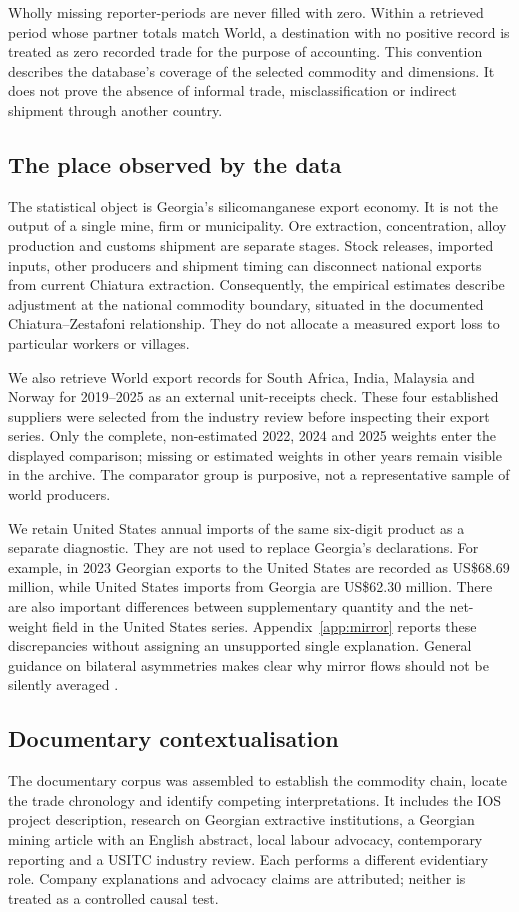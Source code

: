 \documentclass[11pt,a4paper]{article}
\begin{document}
Wholly missing reporter-periods are never filled with zero. Within a retrieved period whose partner totals match World, a destination with no positive record is treated as zero recorded trade for the purpose of accounting. This convention describes the database's coverage of the selected commodity and dimensions. It does not prove the absence of informal trade, misclassification or indirect shipment through another country.

\subsection{The place observed by the data}
The statistical object is Georgia's silicomanganese export economy. It is not the output of a single mine, firm or municipality. Ore extraction, concentration, alloy production and customs shipment are separate stages. Stock releases, imported inputs, other producers and shipment timing can disconnect national exports from current Chiatura extraction. Consequently, the empirical estimates describe adjustment at the national commodity boundary, situated in the documented Chiatura--Zestafoni relationship. They do not allocate a measured export loss to particular workers or villages.

We also retrieve World export records for South Africa, India, Malaysia and Norway for 2019--2025 as an external unit-receipts check. These four established suppliers were selected from the industry review before inspecting their export series. Only the complete, non-estimated 2022, 2024 and 2025 weights enter the displayed comparison; missing or estimated weights in other years remain visible in the archive. The comparator group is purposive, not a representative sample of world producers.

We retain United States annual imports of the same six-digit product as a separate diagnostic. They are not used to replace Georgia's declarations. For example, in 2023 Georgian exports to the United States are recorded as US\$68.69 million, while United States imports from Georgia are US\$62.30 million. There are also important differences between supplementary quantity and the net-weight field in the United States series. Appendix~\ref{app:mirror} reports these discrepancies without assigning an unsupported single explanation. General guidance on bilateral asymmetries makes clear why mirror flows should not be silently averaged \citep{unmirror}.

\subsection{Documentary contextualisation}
The documentary corpus was assembled to establish the commodity chain, locate the trade chronology and identify competing interpretations. It includes the IOS project description, research on Georgian extractive institutions, a Georgian mining article with an English abstract, local labour advocacy, contemporary reporting and a USITC industry review. Each performs a different evidentiary role. Company explanations and advocacy claims are attributed; neither is treated as a controlled causal test.
\end{document}
